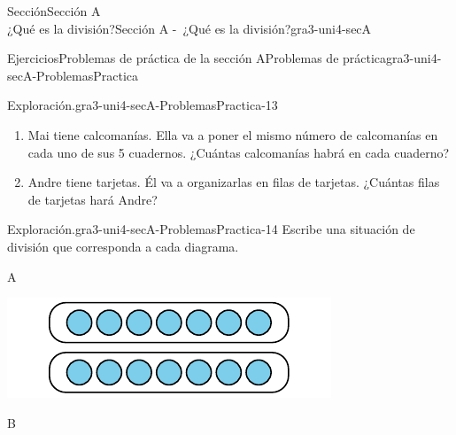 \begin{sectionptx}{Sección}{{\Large Sección A\\}¿Qué es la división?}{}{Sección A -~¿Qué es la división?}{}{}{gra3-uni4-secA}
\begin{exercises-subsection}{Ejercicios}{Problemas de práctica de la sección A}{}{Problemas de práctica}{}{}{gra3-uni4-secA-ProblemasPractica}
\begin{divisionexercise}{11}{Exploración.}{}{gra3-uni4-secA-ProblemasPractica-13}
\par
%
\begin{enumerate}[label={(\alph*)}]
\item{}Mai tiene \textunderscore{}\textunderscore{}\textunderscore{}\textunderscore{}\textunderscore{}\textunderscore{}\textunderscore{}\textunderscore{}\textunderscore{}\textunderscore{} calcomanías. Ella va a poner el mismo número de calcomanías en cada uno de sus 5 cuadernos. ¿Cuántas calcomanías habrá en cada cuaderno?%
\item{}Andre tiene \textunderscore{}\textunderscore{}\textunderscore{}\textunderscore{}\textunderscore{}\textunderscore{}\textunderscore{}\textunderscore{}\textunderscore{}\textunderscore{} tarjetas. Él va a organizarlas en filas de \textunderscore{}\textunderscore{}\textunderscore{}\textunderscore{}\textunderscore{}\textunderscore{}\textunderscore{}\textunderscore{}\textunderscore{}\textunderscore{} tarjetas. ¿Cuántas filas de tarjetas hará Andre?%
\end{enumerate}
%
\end{divisionexercise}%
\clearpage
\begin{divisionexercise}{12}{Exploración.}{}{gra3-uni4-secA-ProblemasPractica-14}%
Escribe una situación de división que corresponda a cada diagrama.%
\begin{sidebyside}{3}{0}{0}{0.02}%
\begin{sbspanel}{0.32}%
A%
\par
\includegraphics[max width=\linewidth, center]{external/svg-source/tikz-file-151674.pdf}
\end{sbspanel}%
\begin{sbspanel}{0.32}%
B%
\par

\end{sbspanel}
\end{sidebyside}
\end{divisionexercise}
\end{exercises-subsection}
\end{sectionptx}
